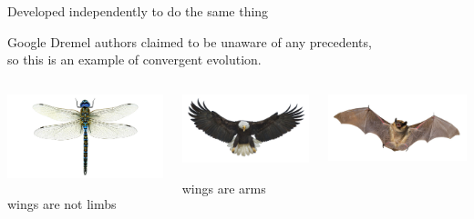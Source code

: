 \documentclass[aspectratio=169]{beamer}
\begin{document}
\begin{frame}{Developed independently to do the same thing}
\begin{center}
\Large Google Dremel authors claimed to be unaware of any precedents, \\ so this is an example of convergent evolution.
\end{center}

\begin{columns}
\begin{center}
\includegraphics[width=\linewidth]{dragonfly.jpg}

\vspace{0.25 cm}
wings are not limbs
\end{center}

\begin{center}
\includegraphics[width=\linewidth]{bird.jpg}

\vspace{0.25 cm}
wings are arms
\end{center}

\begin{center}
\includegraphics[width=\linewidth]{bat.jpg}


\end{center}
\end{columns}
\end{frame}
\end{document}
